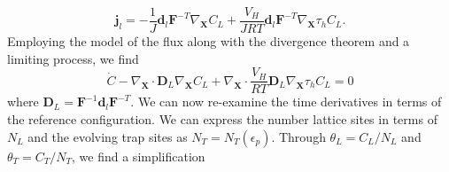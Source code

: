 \documentclass[10pt]{elsarticle}
\newcommand{\mbs}[1]{\boldsymbol{#1}}
\def\bs{{\mbs{s}}} \def\bt{{\mbs{t}}} \def\bu{{\mbs{u}}}
\def\bs{\boldsymbol}
\begin{document}
%
\begin{equation}
\label{eq.flux.ref3}{\bs{j}_{l} = -\frac{1}{J} \bs{d}_{l} \bs{F}^{-T} \nabla_{\bs{X}}C_{L}  + \frac{V_{H}}{J R T} \bs{d}_{l}  \bs{F}^{-T} \nabla_{\bs{X}} \tau_{h}} C
_{L}.
\end{equation}
Employing the model of the flux along with the divergence theorem and a limiting process, we find 
%
%
%
%
%
\begin{equation}
\label{eq.hconservationref3} \dot{C} -   \nabla_{\bs{X}}  \cdot \bs{D}_{L}  \nabla_{\bs{X}} C_{L}  +   \nabla_{\bs{X}}  \cdot \frac{V_{H}}{RT} \bs{D}_{L}  \nabla_{\bs{X}} \tau_{h} C_{L}  = 0
\end{equation}
where $\bs{D}_{L} = \bs{F}^{-1} \bs{d}_{l}   \bs{F}^{-T}$. We can now re-examine the time derivatives in terms of the reference configuration. We can express the number lattice sites in terms of $N_{L}$ and the evolving trap sites as $N_{T} = N_{T}(\epsilon_{p})$. Through $\theta_{L} = C_{L}/N_{L}$ and $\theta_{T} = C_{T}/N_{T}$, we find a simplification
\end{document}
